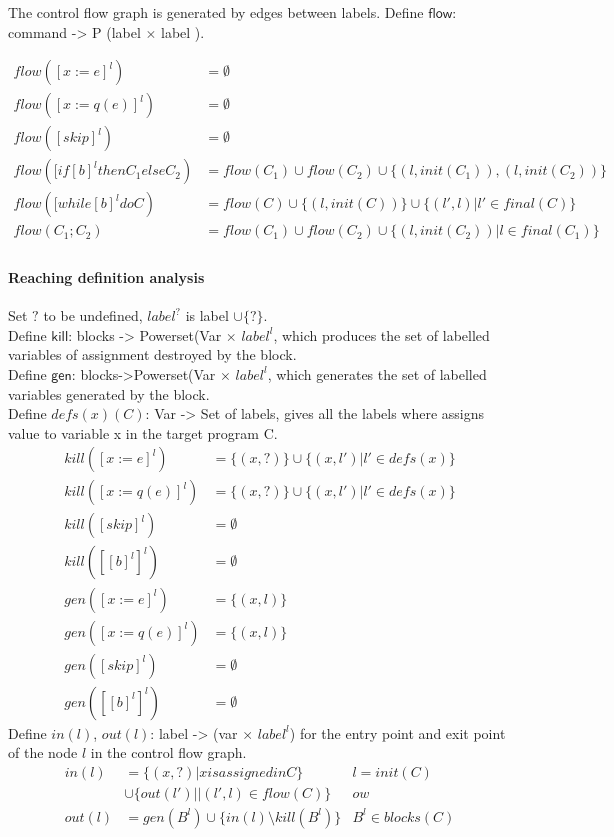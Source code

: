 The control flow graph is generated by edges between labels. Define $\mathsf{flow}$: command -> P (label $\times$ label ).

\[
 \begin{array}{ll}
    flow([x := e]^{l})  & = \emptyset  \\
     flow([x := q(e)]^{l})  & = \emptyset  \\
     flow([skip]^{l})  & = \emptyset \\
     flow([if [b]^l then C_1 else C_2)  & =  flow(C_1) \cup flow(C_2)\cup \{(l, init(C_1)) , (l, init(C_2)) \} \\
     flow([while [b]^l do C)  & =  flow(C) \cup \{(l, init(C)) \} \cup \{(l', l)| l' \in final(C) \} \\
     flow(C_1 ; C_2)  & = flow(C_1) \cup  flow(C_2) \cup \{ (l,init(C_2)) | l \in final(C_1) \} \\
 \end{array}
 \]
 
 \paragraph{Reaching definition analysis}
 Set $?$ to be undefined, $label^{?}$ is label $\cup \{?\}$.\\
 Define $\mathsf{kill}$: blocks -> Powerset(Var $\times$ $label^l$, which produces the set of labelled variables of assignment destroyed by the block.\\
 Define $\mathsf{gen}$: blocks->Powerset(Var $\times$ $label^l$, which generates the set of labelled variables generated by the block.\\
 Define $defs(x)(C)$: Var -> Set of labels, gives all the labels where assigns value to variable x in the target program C.
  \[
 \begin{array}{ll}
    kill([x := e]^{l})  & = \{ (x, ?) \} \cup \{ (x, l') | l' \in defs(x) \} \\
     kill([x := q(e)]^{l})  & = \{ (x, ?) \} \cup \{ (x, l') | l' \in defs(x) \}  \\
     kill([skip]^{l})  & = \emptyset \\
     kill([ [b]^l ]^{l})  & =  \emptyset \\
      gen([x := e]^{l})  & = \{ (x, l) \}  \\
     gen([x := q(e)]^{l})  & = \{ (x, l) \}  \\
     gen([skip]^{l})  & = \emptyset \\
     gen([ [b]^l ]^{l})  & =  \emptyset 
 \end{array}
 \]
 Define $in(l)$, $out(l)$: label -> (var $\times$ $label^l$) for the entry point and exit point of the node $l$ in the control flow graph.
 \[
 \begin{array}{lll}
    in(l)  & = \{ (x, ?) | x is assigned in C  \} & l = init(C)\\
    & \cup \{ out(l')|  | (l',l) \in flow(C) \} & ow \\
     out(l)  & =  gen(B^{l}) \cup \{ in(l) \setminus kill(B^l)  \} & B^l \in blocks(C)   
 \end{array}
 \]
 
